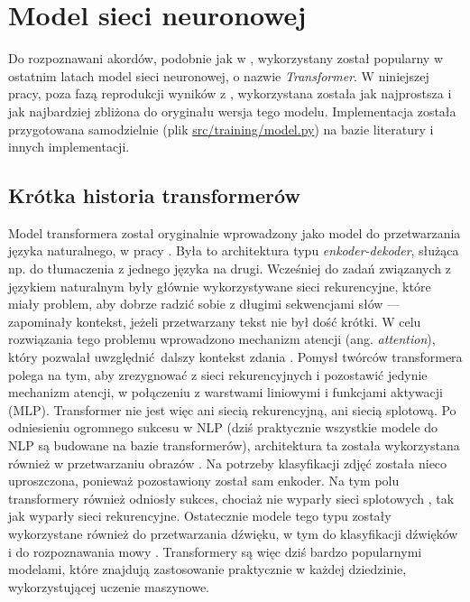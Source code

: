 \section{Model sieci neuronowej}

Do rozpoznawani akordów, podobnie jak w \cite{park_bi-directional_2019}, wykorzystany został popularny w ostatnim latach model sieci neuronowej, o nazwie \emph{Transformer}. W niniejszej pracy, poza fazą reprodukcji wyników z \cite{park_bi-directional_2019}, wykorzystana została jak najprostsza i jak najbardziej zbliżona do oryginału wersja tego modelu. Implementacja została przygotowana samodzielnie (plik \url{src/training/model.py}) na bazie literatury i innych implementacji.


\subsection{Krótka historia transformerów}

Model transformera został oryginalnie wprowadzony jako model do przetwarzania języka naturalnego, w pracy \cite{vaswani_attention_2017}. Była to architektura typu \emph{enkoder-dekoder}, służąca np.  do tłumaczenia z jednego języka na drugi. Wcześniej do zadań związanych z językiem naturalnym były głównie wykorzystywane sieci rekurencyjne, które miały problem, aby dobrze radzić sobie z długimi sekwencjami słów --- zapominały kontekst, jeżeli przetwarzany tekst nie był dość krótki. W celu rozwiązania tego problemu wprowadzono mechanizm atencji (ang. \emph{attention}), który pozwalał uwzględnić dalszy kontekst zdania \cite{bahdanau_neural_2016}. Pomysł twórców transformera polega na tym, aby zrezygnować z sieci rekurencyjnych i pozostawić jedynie mechanizm atencji, w połączeniu z warstwami liniowymi i funkcjami aktywacji (MLP). Transformer nie jest więc ani siecią rekurencyjną, ani siecią splotową. Po odniesieniu ogromnego sukcesu w NLP (dziś praktycznie wszystkie modele do NLP są budowane na bazie transformerów), architektura ta została wykorzystana również w przetwarzaniu obrazów \cite{dosovitskiy_image_2021}. Na potrzeby klasyfikacji zdjęć została nieco uproszczona, ponieważ pozostawiony został sam enkoder. Na tym polu transformery również odniosły sukces, chociaż nie wyparły sieci splotowych \cite{liu_convnet_2022}, tak jak wyparły sieci rekurencyjne. Ostatecznie modele tego typu zostały wykorzystane również do przetwarzania dźwięku, w tym do klasyfikacji dźwięków \cite{gong_ast_2021} i do rozpoznawania mowy \cite{kim_squeezeformer_2022}. Transformery są więc dziś bardzo popularnymi modelami, które znajdują zastosowanie praktycznie w każdej dziedzinie, wykorzystującej uczenie maszynowe.

